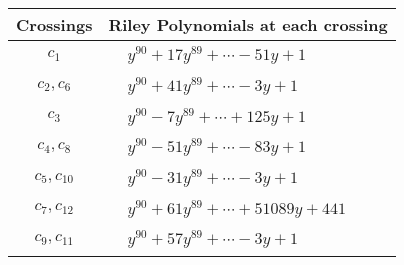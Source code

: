 \documentclass[1p]{elsarticle_modified}
\theoremstyle{definition}
\begin{document}
\begin{tabular}{m{50pt}|m{274pt}}
Crossings & \hspace{64pt}Riley Polynomials at each crossing \\
\hline $$\begin{aligned}c_{1}\end{aligned}$$&$\begin{aligned}
&y^{90}+17 y^{89}+\cdots-51 y+1
\end{aligned}$\\
\hline $$\begin{aligned}c_{2},c_{6}\end{aligned}$$&$\begin{aligned}
&y^{90}+41 y^{89}+\cdots-3 y+1
\end{aligned}$\\
\hline $$\begin{aligned}c_{3}\end{aligned}$$&$\begin{aligned}
&y^{90}-7 y^{89}+\cdots+125 y+1
\end{aligned}$\\
\hline $$\begin{aligned}c_{4},c_{8}\end{aligned}$$&$\begin{aligned}
&y^{90}-51 y^{89}+\cdots-83 y+1
\end{aligned}$\\
\hline $$\begin{aligned}c_{5},c_{10}\end{aligned}$$&$\begin{aligned}
&y^{90}-31 y^{89}+\cdots-3 y+1
\end{aligned}$\\
\hline $$\begin{aligned}c_{7},c_{12}\end{aligned}$$&$\begin{aligned}
&y^{90}+61 y^{89}+\cdots+51089 y+441
\end{aligned}$\\
\hline $$\begin{aligned}c_{9},c_{11}\end{aligned}$$&$\begin{aligned}
&y^{90}+57 y^{89}+\cdots-3 y+1
\end{aligned}$\\
\hline
\end{tabular}
\vskip 2pc
\end{document}
